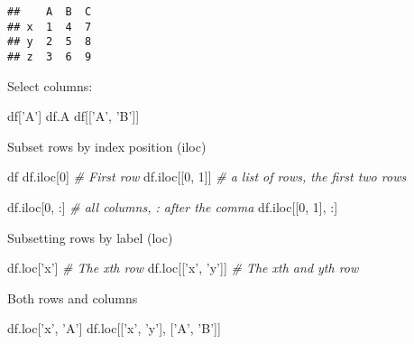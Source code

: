 \documentclass[]{book}
\newenvironment{Shaded}{\begin{snugshade}}{\end{snugshade}}
\newcommand{\CommentTok}[1]{\textcolor[rgb]{0.56,0.35,0.01}{\textit{#1}}}
\newcommand{\DecValTok}[1]{\textcolor[rgb]{0.00,0.00,0.81}{#1}}
\newcommand{\NormalTok}[1]{#1}
\newcommand{\StringTok}[1]{\textcolor[rgb]{0.31,0.60,0.02}{#1}}
\theoremstyle{definition}
\theoremstyle{definition}
\theoremstyle{definition}
\theoremstyle{remark}
\begin{document}
\begin{verbatim}
##    A  B  C
## x  1  4  7
## y  2  5  8
## z  3  6  9
\end{verbatim}

Select columns:

\begin{Shaded}
\begin{Highlighting}[]
\NormalTok{df[}\StringTok{'A'}\NormalTok{]}
\NormalTok{df.A}
\NormalTok{df[[}\StringTok{'A'}\NormalTok{, }\StringTok{'B'}\NormalTok{]]}
\end{Highlighting}
\end{Shaded}

Subset rows by index position (iloc)

\begin{Shaded}
\begin{Highlighting}[]
\NormalTok{df}
\NormalTok{df.iloc[}\DecValTok{0}\NormalTok{] }\CommentTok{# First row}
\NormalTok{df.iloc[[}\DecValTok{0}\NormalTok{, }\DecValTok{1}\NormalTok{]] }\CommentTok{# a list of rows, the first two rows}
\end{Highlighting}
\end{Shaded}

\begin{Shaded}
\begin{Highlighting}[]
\NormalTok{df.iloc[}\DecValTok{0}\NormalTok{, :] }\CommentTok{# all columns, : after the comma}
\NormalTok{df.iloc[[}\DecValTok{0}\NormalTok{, }\DecValTok{1}\NormalTok{], :]}
\end{Highlighting}
\end{Shaded}

Subsetting rows by label (loc)

\begin{Shaded}
\begin{Highlighting}[]
\NormalTok{df.loc[}\StringTok{'x'}\NormalTok{] }\CommentTok{# The xth row}
\NormalTok{df.loc[[}\StringTok{'x'}\NormalTok{, }\StringTok{'y'}\NormalTok{]] }\CommentTok{# The xth and yth row}
\end{Highlighting}
\end{Shaded}

Both rows and columns

\begin{Shaded}
\begin{Highlighting}[]
\NormalTok{df.loc[}\StringTok{'x'}\NormalTok{, }\StringTok{'A'}\NormalTok{]}
\NormalTok{df.loc[[}\StringTok{'x'}\NormalTok{, }\StringTok{'y'}\NormalTok{], [}\StringTok{'A'}\NormalTok{, }\StringTok{'B'}\NormalTok{]]}
\end{Highlighting}
\end{Shaded}
\end{document}
